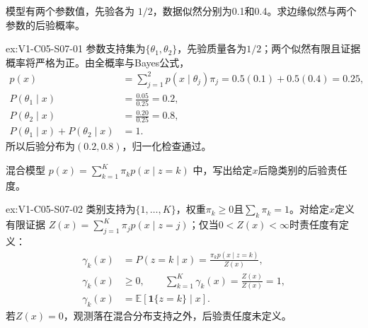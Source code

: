 \begin{SLChapterExercisePairSection}
\begin{exercise}\label{ex:V1-C05-S07-01}
模型有两个参数值，先验各为 $1/2$，数据似然分别为0.1和0.4。求边缘似然与两个参数的后验概率。
\end{exercise}
\label{sol:V1-C05-S07-01}
\begin{chapterexercisesolution}{ex:V1-C05-S07-01}
参数支持集为$\{\theta_1,\theta_2\}$，先验质量各为$1/2$；两个似然有限且证据概率将严格为正。由全概率与Bayes公式，
\[
\begin{aligned}
p(x)&=\sum_{j=1}^2p(x\mid\theta_j)\pi_j
=0.5(0.1)+0.5(0.4)=0.25,\\
P(\theta_1\mid x)&=\frac{0.05}{0.25}=0.2,\\
P(\theta_2\mid x)&=\frac{0.20}{0.25}=0.8,\\
P(\theta_1\mid x)+P(\theta_2\mid x)&=1.
\end{aligned}
\]
所以后验分布为$(0.2,0.8)$，归一化检查通过。
\end{chapterexercisesolution}

\begin{exercise}\label{ex:V1-C05-S07-02}
混合模型 $p(x)=\sum_{k=1}^K\pi_kp(x\mid z=k)$ 中，写出给定$x$后隐类别的后验责任度。
\end{exercise}
\label{sol:V1-C05-S07-02}
\begin{chapterexercisesolution}{ex:V1-C05-S07-02}
类别支持为$\{1,\ldots,K\}$，权重$\pi_k\ge0$且$\sum_k\pi_k=1$。对给定$x$定义有限证据
$Z(x)=\sum_{j=1}^K\pi_jp(x\mid z=j)$；仅当$0<Z(x)<\infty$时责任度有定义：
\[
\begin{aligned}
\gamma_k(x)
&=P(z=k\mid x)
=\frac{\pi_kp(x\mid z=k)}{Z(x)},\\
\gamma_k(x)&\ge0,\qquad
\sum_{k=1}^K\gamma_k(x)
=\frac{Z(x)}{Z(x)}=1,\\
\gamma_k(x)&=\mathbb E[\mathbf1\{z=k\}\mid x].
\end{aligned}
\]
若$Z(x)=0$，观测落在混合分布支持之外，后验责任度未定义。
\end{chapterexercisesolution}


\end{SLChapterExercisePairSection}
